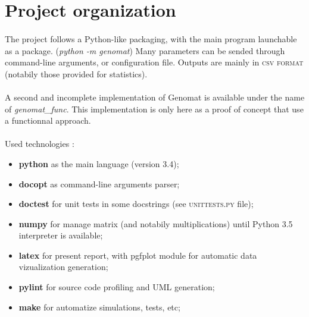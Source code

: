 \documentclass[]{report} %
\begin{document}
\section*{Project organization}
	\paragraph*{}
        The project follows a Python-like packaging, with the main program launchable as a package. (\textit{python -m genomat})
        Many parameters can be sended through command-line arguments, or configuration file.
        Outputs are mainly in \textsc{csv format} (notabily those provided for statistics).

	\paragraph*{}
        A second and incomplete implementation of Genomat is available under the name of \textit{genomat\_func}. 
        This implementation is only here as a proof of concept that use a functionnal approach.

	\paragraph*{}
        Used technologies :
        \begin{itemize}
                \item \textbf{python} as the main language (version 3.4);
                \item \textbf{docopt} as command-line arguments parser;
                \item \textbf{doctest} for unit tests in some docstrings (see \textsc{unittests.py} file);
                \item \textbf{numpy} for manage matrix (and notabily multiplications) until Python 3.5 interpreter is available;
                \item \textbf{latex} for present report, with pgfplot module for automatic data vizualization generation;
                \item \textbf{pylint} for source code profiling and UML generation;
                \item \textbf{make} for automatize simulations, tests, etc;
        \end{itemize}
\end{document}
